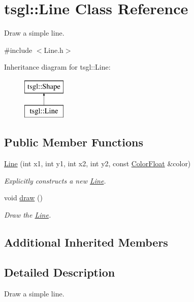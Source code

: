 \hypertarget{classtsgl_1_1_line}{}\section{tsgl\+:\+:Line Class Reference}
\label{classtsgl_1_1_line}


Draw a simple line.  




{\ttfamily \#include $<$Line.\+h$>$}

Inheritance diagram for tsgl\+:\+:Line\+:\begin{figure}[H]
\begin{center}
\leavevmode
\includegraphics[height=2.000000cm]{classtsgl_1_1_line}
\end{center}
\end{figure}
\subsection*{Public Member Functions}
\begin{DoxyCompactItemize}
\item 
\hyperlink{classtsgl_1_1_line_af16488259ac5978679e13d58cf7e91ef}{Line} (int x1, int y1, int x2, int y2, const \hyperlink{structtsgl_1_1_color_float}{Color\+Float} \&color)
\begin{DoxyCompactList}\small\item\em Explicitly constructs a new \hyperlink{classtsgl_1_1_line}{Line}. \end{DoxyCompactList}\item 
void \hyperlink{classtsgl_1_1_line_ae7eccbbf5230a4c68139560d810af415}{draw} ()
\begin{DoxyCompactList}\small\item\em Draw the \hyperlink{classtsgl_1_1_line}{Line}. \end{DoxyCompactList}\end{DoxyCompactItemize}
\subsection*{Additional Inherited Members}


\subsection{Detailed Description}
Draw a simple line. 

